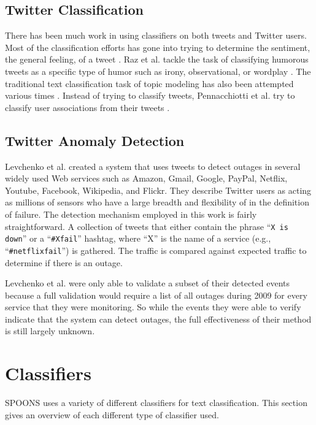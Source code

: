 \documentclass[12pt]{ucthesis}
\begin{document}
\subsection{Twitter Classification}
\label{background-twitter-classification}
There has been much work in using classifiers on both tweets and Twitter users.
Most of the classification efforts has gone into trying to determine the sentiment,
the general feeling, of a tweet \cite{Jiang}\cite{Mukherjee}\cite{Saif}\cite{Wang}.
Raz et al. tackle the task of classifying humorous tweets as a specific type of humor
such as irony, observational, or wordplay \cite{Raz}.
The traditional text classification task of topic modeling has also been attempted various times \cite{hong}\cite{Zhao}.
Instead of trying to classify tweets, Pennacchiotti et al. try to classify user associations from
their tweets \cite{Pennacchiotti}.

\subsection{Twitter Anomaly Detection}
\label{background-twitter-anomaly}
Levchenko et al.\cite{levchenko} created a system that uses tweets to detect outages in several widely used Web services such as Amazon, Gmail, Google, PayPal, Netflix, Youtube, Facebook, Wikipedia, and Flickr.
They describe Twitter users as acting as millions of sensors who have a large breadth and flexibility of in the definition of failure.
The detection mechanism employed in this work is fairly straightforward.
A collection of tweets that either contain the phrase ``\texttt{X is down}'' or a ``\texttt{\#Xfail}'' hashtag, where ``X'' is the name of a service (e.g., ``\texttt{\#netflixfail}'') is gathered.
The traffic is compared against expected traffic to determine if there is an outage.

Levchenko et al. were only able to validate a subset of their detected events because a full validation would require a list of all outages during 2009 for every service that they were monitoring.
So while the events they were able to verify indicate that the system can detect outages, the full effectiveness of their method is still largely unknown.

\section{Classifiers}
\label{background-classifiers}
SPOONS uses a variety of different classifiers for text classification.
This section gives an overview of each different type of classifier used.
\end{document}
